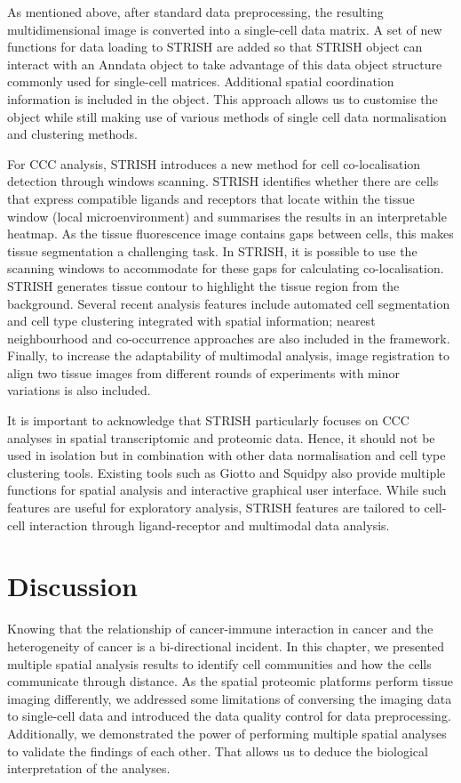 As mentioned above, after standard data preprocessing, the resulting multidimensional image is converted into a single-cell data matrix. A set of new functions for data loading to STRISH are added so that STRISH object can interact with an Anndata object \cite{wolf2018scanpy} to take advantage of this data object structure commonly used for single-cell matrices. Additional spatial coordination information is included in the object. This approach allows us to customise the object while still making use of various methods of single cell data normalisation and clustering methods. 

For CCC analysis, STRISH introduces a new method for cell co-localisation detection through windows scanning. STRISH identifies whether there are cells that express compatible ligands and receptors that locate within the tissue window (local microenvironment) and summarises the results in an interpretable heatmap. As the tissue fluorescence image contains gaps between cells, this makes tissue segmentation a challenging task. In STRISH, it is possible to use the scanning windows to accommodate for these gaps for calculating co-localisation. STRISH generates tissue contour to highlight the tissue region from the background. Several recent analysis features include automated cell segmentation and cell type clustering integrated with spatial information; nearest neighbourhood and co-occurrence approaches are also included in the framework. Finally, to increase the adaptability of multimodal analysis, image registration to align two tissue images from different rounds of experiments with minor variations is also included.   

It is important to acknowledge that STRISH particularly focuses on CCC analyses in spatial transcriptomic and proteomic data. Hence, it should not be used in isolation but in combination with other data normalisation and cell type clustering tools. Existing tools such as Giotto and Squidpy also provide multiple functions for spatial analysis and interactive graphical user interface. While such features are useful for exploratory analysis, STRISH features are tailored to cell-cell interaction through ligand-receptor and multimodal data analysis. 

\section{Discussion}
Knowing that the relationship of cancer-immune interaction in cancer and the heterogeneity of cancer is a bi-directional incident. In this chapter, we presented multiple spatial analysis results to identify cell communities and how the cells communicate through distance. As the spatial proteomic platforms perform tissue imaging differently, we addressed some limitations of conversing the imaging data to single-cell data and introduced the data quality control for data preprocessing. Additionally, we demonstrated the power of performing multiple spatial analyses to validate the findings of each other. That allows us to deduce the biological interpretation of the analyses.      

